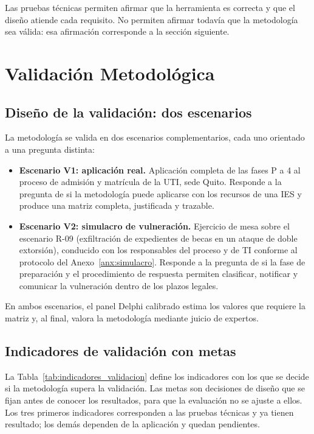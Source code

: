 Las pruebas técnicas permiten afirmar que la herramienta es correcta y que el diseño atiende cada requisito. No permiten afirmar todavía que la metodología sea válida: esa afirmación corresponde a la sección siguiente.

\section{Validación Metodológica}
\label{sec:validacion_metodologica}

\subsection{Diseño de la validación: dos escenarios}

La metodología se valida en dos escenarios complementarios, cada uno orientado a una pregunta distinta:

\begin{itemize}
  \item \textbf{Escenario V1: aplicación real.} Aplicación completa de las fases P a 4 al proceso de admisión y matrícula de la UTI, sede Quito. Responde a la pregunta de si la metodología puede aplicarse con los recursos de una IES y produce una matriz completa, justificada y trazable.
  \item \textbf{Escenario V2: simulacro de vulneración.} Ejercicio de mesa sobre el escenario R-09 (exfiltración de expedientes de becas en un ataque de doble extorsión), conducido con los responsables del proceso y de TI conforme al protocolo del Anexo~\ref{anx:simulacro}. Responde a la pregunta de si la fase de preparación y el procedimiento de respuesta permiten clasificar, notificar y comunicar la vulneración dentro de los plazos legales.
\end{itemize}

En ambos escenarios, el panel Delphi calibrado estima los valores que requiere la matriz y, al final, valora la metodología mediante juicio de expertos.

\subsection{Indicadores de validación con metas}

La Tabla~\ref{tab:indicadores_validacion} define los indicadores con los que se decide si la metodología supera la validación. Las metas son decisiones de diseño que se fijan antes de conocer los resultados, para que la evaluación no se ajuste a ellos. Los tres primeros indicadores corresponden a las pruebas técnicas y ya tienen resultado; los demás dependen de la aplicación y quedan pendientes.

